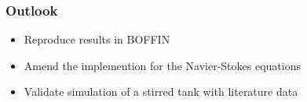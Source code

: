 \documentclass[10pt,xcolor=dvipsnames]{beamer}
\begin{document}
\begin{frame}
\frametitle{Outlook}
\begin{itemize}
   \item Reproduce results in BOFFIN
   \item Amend the implemention for the Navier-Stokes equations
   \item Validate simulation of a stirred tank with literature data
 \end{itemize}

\end{frame}

\begin{frame}[c]
  \frametitle{$ $}
  \begin{center}
  \end{center}
\end{frame}
\end{document}
